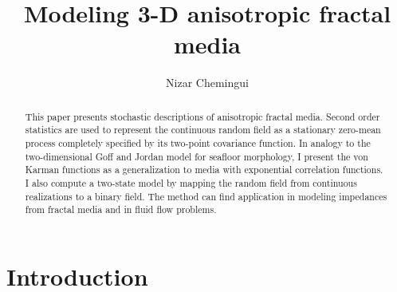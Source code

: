 %
\title{Modeling 3-D anisotropic fractal media}
%
\author{Nizar Chemingui}
%
\begin{abstract}
 This paper presents stochastic descriptions of anisotropic fractal media. 
Second order statistics are used to represent the continuous random field as a 
stationary zero-mean process completely specified by its two-point covariance
function. 
In analogy to the two-dimensional Goff and 
Jordan model for seafloor morphology, I present the von Karman functions as
a generalization to media with exponential correlation functions. 
I also compute a two-state
model by mapping the random field from continuous realizations to a binary 
field. The method can find application in modeling impedances from fractal
media and in fluid flow problems. 
\end{abstract}

\section{Introduction}


